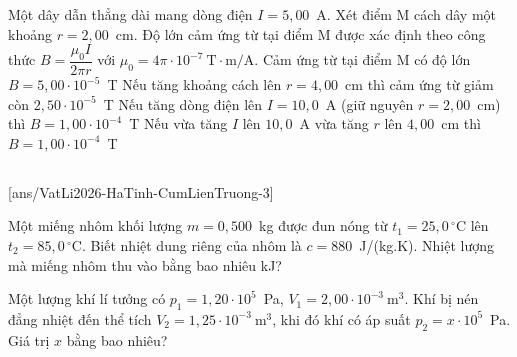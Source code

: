 	\begin{ex}%
		Một dây dẫn thẳng dài mang dòng điện $I=5{,}00$~A. Xét điểm M cách dây một khoảng $r=2{,}00$~cm. Độ lớn cảm ứng từ tại điểm M được xác định theo công thức $B=\dfrac{\mu_0 I}{2\pi r}$ với $\mu_0=4\pi\cdot 10^{-7}~\text{T}\cdot\text{m/A}$.
		\choiceTFt
		{\True Cảm ứng từ tại điểm M có độ lớn $B=5{,}00\cdot 10^{-5}$~T}
		{\True Nếu tăng khoảng cách lên $r=4{,}00$~cm thì cảm ứng từ giảm còn $2{,}50\cdot 10^{-5}$~T}
		{\True Nếu tăng dòng điện lên $I=10{,}0$~A (giữ nguyên $r=2{,}00$~cm) thì $B=1{,}00\cdot 10^{-4}$~T}
		{Nếu vừa tăng $I$ lên $10{,}0$~A vừa tăng $r$ lên $4{,}00$~cm thì $B=1{,}00\cdot 10^{-4}$~T}
	\end{ex}

	\subsection*{}
	\setcounter{ex}{0}
	[ans/VatLi2026-HaTinh-CumLienTruong-3]

	\begin{ex}%
		Một miếng nhôm khối lượng $m=0{,}500$~kg được đun nóng từ $t_1=25{,}0\,^\circ\text{C}$ lên $t_2=85{,}0\,^\circ\text{C}$. Biết nhiệt dung riêng của nhôm là $c=880$~J/(kg.K). Nhiệt lượng mà miếng nhôm thu vào bằng bao nhiêu kJ?
		\par
	\end{ex}

	\begin{ex}%
		Một lượng khí lí tưởng có $p_1=1{,}20\cdot 10^5$~Pa, $V_1=2{,}00\cdot 10^{-3}~\text{m}^3$. Khí bị nén đẳng nhiệt đến thể tích $V_2=1{,}25\cdot 10^{-3}~\text{m}^3$, khi đó khí có áp suất $p_2=x\cdot 10^5$~Pa. Giá trị $x$ bằng bao nhiêu?
		\par
	\end{ex}

